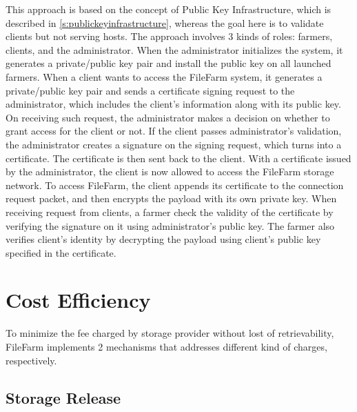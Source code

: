 \newpage

This approach is based on the concept of Public Key Infrastructure, which is described in \ref{s:publickeyinfrastructure}, whereas the goal here is to validate clients but not serving hosts. The approach involves 3 kinds of roles: farmers, clients, and the administrator. When the administrator initializes the system, it generates a private/public key pair and install the public key on all launched farmers. When a client wants to access the FileFarm system, it generates a private/public key pair and sends a certificate signing request to the administrator, which includes the client's information along with its public key. On receiving such request, the administrator makes a decision on whether to grant access for the client or not. If the client passes administrator's validation, the administrator creates a signature on the signing request, which turns into a certificate. The certificate is then sent back to the client. With a certificate issued by the administrator, the client is now allowed to access the FileFarm storage network. To access FileFarm, the client appends its certificate to the connection request packet, and then encrypts the payload with its own private key. When receiving request from clients, a farmer check the validity of the certificate by verifying the signature on it using administrator's public key. The farmer also verifies client's identity by decrypting the payload using client's public key specified in the certificate.

\section{Cost Efficiency}
\label{s:costefficiency}

To minimize the fee charged by storage provider without lost of retrievability, FileFarm implements 2 mechanisms that addresses different kind of charges, respectively.

\subsection{Storage Release}
\label{ss:storagerelease}

